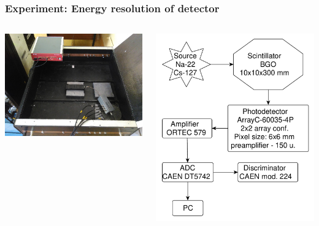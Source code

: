 \documentclass[11pt]{beamer}
\begin{document}
\begin{frame}
    \frametitle{Experiment: Energy resolution of detector}
    \begin{columns}
        \begin{column}{0.5\textwidth}
            
            \includegraphics[width=1\textwidth]{figures/setup1.png}
        \end{column}
                \begin{column}{0.5\textwidth}
            \includegraphics[width=1\textwidth]{figures/yed.pdf}
        \end{column}
    \end{columns}  
\end{frame}
\end{document}
